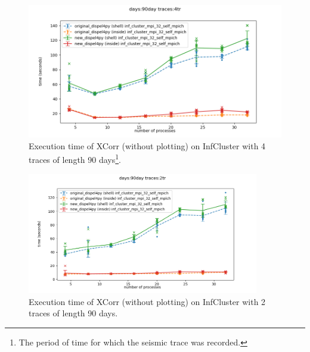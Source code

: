 \begin{figure}[h]
\centering
    \includegraphics[width=1\textwidth]{figures/xcorr_infcluster_90day_4tr}
  \begin{minipage}{\textwidth}

    \caption[Caption for LOF]%
      {Execution time of XCorr (without plotting) on InfCluster with 4 traces of length 90 days\footnote{The period of time for which the seismic trace was recorded.}.}
  \end{minipage}
\label{fig:xcorr_infcluster}
\end{figure}

\begin{figure}[h]
\centering
    \includegraphics[width=0.9\textwidth]{figures/xcorr_infcluster_90day_2tr}
\caption{Execution time of XCorr (without plotting) on InfCluster with 2 traces of length 90 days.}
\label{fig:xcorr_infcluster_90_2}
\end{figure}

